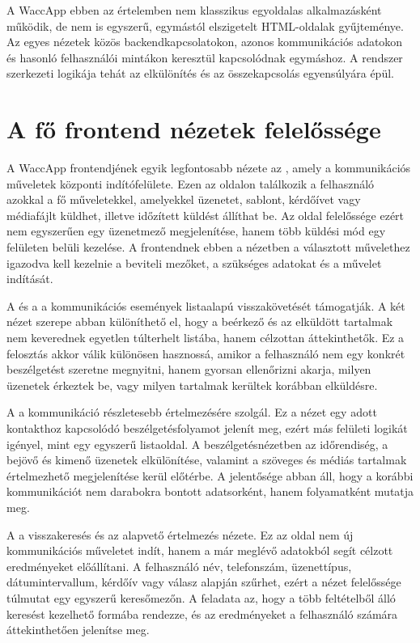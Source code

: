 A WaccApp ebben az értelemben nem klasszikus egyoldalas alkalmazásként működik, de nem is egyszerű, egymástól elszigetelt HTML-oldalak gyűjteménye. Az egyes nézetek közös backendkapcsolatokon, azonos kommunikációs adatokon és hasonló felhasználói mintákon keresztül kapcsolódnak egymáshoz. A rendszer szerkezeti logikája tehát az elkülönítés és az összekapcsolás egyensúlyára épül. 

\section{A fő frontend nézetek felelőssége}

A WaccApp frontendjének egyik legfontosabb nézete az , amely a kommunikációs műveletek központi indítófelülete. Ezen az oldalon találkozik a felhasználó azokkal a fő műveletekkel, amelyekkel üzenetet, sablont, kérdőívet vagy médiafájlt küldhet, illetve időzített küldést állíthat be. Az oldal felelőssége ezért nem egyszerűen egy üzenetmező megjelenítése, hanem több küldési mód egy felületen belüli kezelése. A frontendnek ebben a nézetben a választott művelethez igazodva kell kezelnie a beviteli mezőket, a szükséges adatokat és a művelet indítását. 

A  és a  a kommunikációs események listaalapú visszakövetését támogatják. A két nézet szerepe abban különíthető el, hogy a beérkező és az elküldött tartalmak nem keverednek egyetlen túlterhelt listába, hanem célzottan áttekinthetők. Ez a felosztás akkor válik különösen hasznossá, amikor a felhasználó nem egy konkrét beszélgetést szeretne megnyitni, hanem gyorsan ellenőrizni akarja, milyen üzenetek érkeztek be, vagy milyen tartalmak kerültek korábban elküldésre. 

A  a kommunikáció részletesebb értelmezésére szolgál. Ez a nézet egy adott kontakthoz kapcsolódó beszélgetésfolyamot jelenít meg, ezért más felületi logikát igényel, mint egy egyszerű listaoldal. A beszélgetésnézetben az időrendiség, a bejövő és kimenő üzenetek elkülönítése, valamint a szöveges és médiás tartalmak értelmezhető megjelenítése kerül előtérbe. A  jelentősége abban áll, hogy a korábbi kommunikációt nem darabokra bontott adatsorként, hanem folyamatként mutatja meg. 

A  a visszakeresés és az alapvető értelmezés nézete. Ez az oldal nem új kommunikációs műveletet indít, hanem a már meglévő adatokból segít célzott eredményeket előállítani. A felhasználó név, telefonszám, üzenettípus, dátumintervallum, kérdőív vagy válasz alapján szűrhet, ezért a nézet felelőssége túlmutat egy egyszerű keresőmezőn. A  feladata az, hogy a több feltételből álló keresést kezelhető formába rendezze, és az eredményeket a felhasználó számára áttekinthetően jelenítse meg. 

